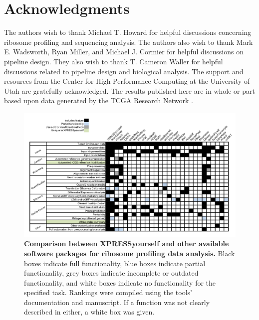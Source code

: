 \documentclass[10pt, oneside]{article}
\newcommand{\beginsupplement}{%
  \setcounter{table}{0}
  \renewcommand{\thetable}{S\arabic{table}}%
  \setcounter{figure}{0}
  \renewcommand{\thefigure}{S\arabic{figure}}%
}
\begin{document}
\section*{Acknowledgments}
The authors wish to thank Michael T. Howard for helpful discussions concerning ribosome profiling and sequencing analysis. The authors also wish to thank Mark E. Wadsworth, Ryan Miller, and Michael J. Cormier for helpful discussions on pipeline design. They also wish to thank T. Cameron Waller for helpful discussions related to pipeline design and biological analysis. The support and resources from the Center for High-Performance Computing at the University of Utah are gratefully acknowledged. The results published here are in whole or part based upon data generated by the TCGA Research Network \cite{tcga}.\\




\newpage
\beginsupplement

\begin{figure}
\centering
  \includegraphics[width=180mm]{figures/xpresspipe_supplement1.png}
  \caption{\textbf{Comparison between XPRESSyourself and other available software packages for ribosome profiling data analysis.} Black boxes indicate full functionality, blue boxes indicate partial functionality, grey boxes indicate incomplete or outdated functionality, and white boxes indicate no functionality for the specified task. Rankings were compiled using the tools' documentation and manuscript. If a function was not clearly described in either, a white box was given.}
  \label{fig:supplement1}
\end{figure}
\end{document}
